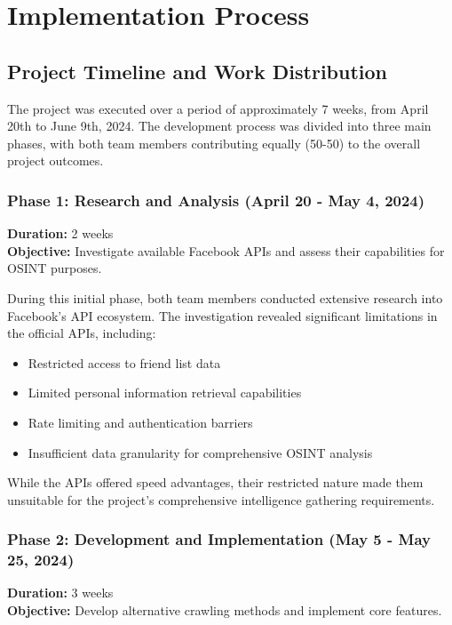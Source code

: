 \documentclass[13pt,a4paper]{report}
\begin{document}
\chapter{Implementation Process}
\section{Project Timeline and Work Distribution}

The project was executed over a period of approximately 7 weeks, from April 20th to June 9th, 2024. The development process was divided into three main phases, with both team members contributing equally (50-50) to the overall project outcomes.

\subsection{Phase 1: Research and Analysis (April 20 - May 4, 2024)}
\textbf{Duration:} 2 weeks \\
\textbf{Objective:} Investigate available Facebook APIs and assess their capabilities for OSINT purposes.

During this initial phase, both team members conducted extensive research into Facebook's API ecosystem. The investigation revealed significant limitations in the official APIs, including:
\begin{itemize}
    \item Restricted access to friend list data
    \item Limited personal information retrieval capabilities  
    \item Rate limiting and authentication barriers
    \item Insufficient data granularity for comprehensive OSINT analysis
\end{itemize}

While the APIs offered speed advantages, their restricted nature made them unsuitable for the project's comprehensive intelligence gathering requirements.

\subsection{Phase 2: Development and Implementation (May 5 - May 25, 2024)}
\textbf{Duration:} 3 weeks \\
\textbf{Objective:} Develop alternative crawling methods and implement core features.
\end{document}
